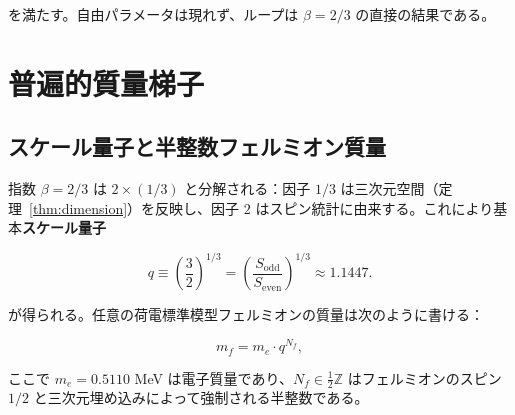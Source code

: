 \documentclass[12pt,a4paper]{article}
\theoremstyle{remark}
\begin{document}
	を満たす。自由パラメータは現れず、ループは \(\beta = 2/3\) の直接の結果である。
	
	\section{普遍的質量梯子}
	\label{sec:mass-ladder}
	
	\subsection{スケール量子と半整数フェルミオン質量}
	
	指数 \(\beta = 2/3\) は \(2 \times (1/3)\) と分解される：因子 \(1/3\) は三次元空間（定理~\ref{thm:dimension}）を反映し、因子 \(2\) はスピン統計に由来する。これにより基本\textbf{スケール量子}
	
	\begin{equation}
		q \equiv \left(\frac{3}{2}\right)^{1/3}
		= \left(\frac{S_{\mathrm{odd}}}{S_{\mathrm{even}}}\right)^{1/3} \approx 1.1447.
	\end{equation}
	
	が得られる。任意の荷電標準模型フェルミオンの質量は次のように書ける：
	
	\begin{equation}
		\boxed{m_f = m_e \cdot q^{N_f}},
		\label{eq:mass-quantization}
	\end{equation}
	
	ここで \(m_e = 0.5110\) MeV は電子質量であり、\(N_f \in \frac{1}{2}\mathbb{Z}\) はフェルミオンのスピン \(1/2\) と三次元埋め込みによって強制される半整数である。
	
\end{document}
